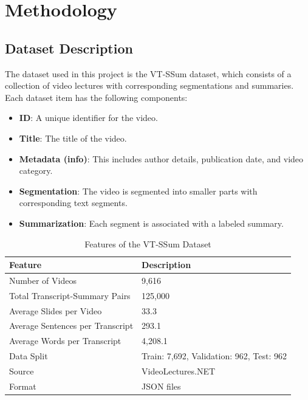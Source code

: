 \documentclass[conference]{IEEEtran}
\begin{document}
\section{Methodology}

\subsection{Dataset Description}
The dataset used in this project is the VT-SSum dataset, which consists of a collection of video lectures with corresponding segmentations and summaries. Each dataset item has the following components:
\begin{itemize}
    \item \textbf{ID}: A unique identifier for the video.
    \item \textbf{Title}: The title of the video.
    \item \textbf{Metadata (info)}: This includes author details, publication date, and video category.
    \item \textbf{Segmentation}: The video is segmented into smaller parts with corresponding text segments.
    \item \textbf{Summarization}: Each segment is associated with a labeled summary.
\end{itemize}

\begin{table}[h]
\centering
\label{tab:vt_ssum_features}
\begin{tabular}{|l|l|}
\hline
\textbf{Feature}                  & \textbf{Description}                                         \\ \hline
Number of Videos                  & 9,616                                                       \\ \hline
Total Transcript-Summary Pairs    & 125,000                                                     \\ \hline
Average Slides per Video          & 33.3                                                        \\ \hline
Average Sentences per Transcript  & 293.1                                                       \\ \hline
Average Words per Transcript      & 4,208.1                                                     \\ \hline
Data Split                        & Train: 7,692, Validation: 962, Test: 962                    \\ \hline
Source                            & VideoLectures.NET      \\ \hline
Format                            & JSON files              \\ \hline
\end{tabular}
\caption{Features of the VT-SSum Dataset}
\end{table}
\end{document}
